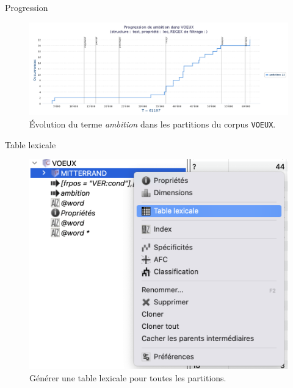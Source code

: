\documentclass[xetex,xcolor={table,usenames,dvipsnames}]{beamer}
\begin{document}
\begin{frame}{Progression}
	\begin{figure}[h] %
		\centering
		\includegraphics[width=1\linewidth]{img/ambition.png}
		\caption{Évolution du terme \textit{ambition} dans les partitions du corpus \texttt{VOEUX}.}
		\label{fig:ling_out_TAL}
	\end{figure}
\end{frame}

\begin{frame}{Table lexicale}
		\begin{figure}[h] %
		\centering
		\includegraphics[width=.7\linewidth]{img/table_lexicale.png}
		\caption{Générer une table lexicale pour toutes les partitions.}
		\label{fig:ling_out_TAL}
	\end{figure}
\end{frame}
\end{document}
